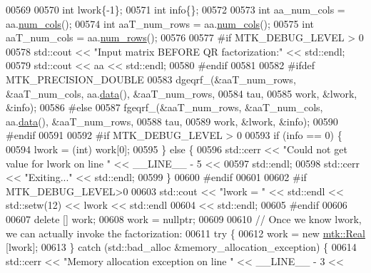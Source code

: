 \begin{DoxyCode}
00569 
00570   \textcolor{keywordtype}{int} lwork\{-1\};
00571   \textcolor{keywordtype}{int} info\{\};
00572 
00573   \textcolor{keywordtype}{int} aa\_num\_cols = aa.\hyperlink{classmtk_1_1DenseMatrix_af6f78373aaf2136f0c78974d7c8de0a8}{num\_cols}();
00574   \textcolor{keywordtype}{int} aaT\_num\_rows = aa.\hyperlink{classmtk_1_1DenseMatrix_af6f78373aaf2136f0c78974d7c8de0a8}{num\_cols}();
00575   \textcolor{keywordtype}{int} aaT\_num\_cols = aa.\hyperlink{classmtk_1_1DenseMatrix_a17d8d3b9cc0926044b6972dd190a5c21}{num\_rows}();
00576 
00577 \textcolor{preprocessor}{  #if MTK\_DEBUG\_LEVEL > 0}
00578   std::cout << \textcolor{stringliteral}{"Input matrix BEFORE QR factorization:"} << std::endl;
00579   std::cout << aa << std::endl;
00580 \textcolor{preprocessor}{  #endif}
00581 
00582 \textcolor{preprocessor}{  #ifdef MTK\_PRECISION\_DOUBLE}
00583   dgeqrf\_(&aaT\_num\_rows, &aaT\_num\_cols, aa.\hyperlink{classmtk_1_1DenseMatrix_a16b3ff56feb2658b9fc7147d1de4d8e7}{data}(), &aaT\_num\_rows,
00584           tau,
00585           work, &lwork, &info);
00586 \textcolor{preprocessor}{  #else}
00587   fgeqrf\_(&aaT\_num\_rows, &aaT\_num\_cols, aa.\hyperlink{classmtk_1_1DenseMatrix_a16b3ff56feb2658b9fc7147d1de4d8e7}{data}(), &aaT\_num\_rows,
00588           tau,
00589           work, &lwork, &info);
00590 \textcolor{preprocessor}{  #endif}
00591 
00592 \textcolor{preprocessor}{  #if MTK\_DEBUG\_LEVEL > 0}
00593   \textcolor{keywordflow}{if} (info == 0) \{
00594     lwork = (int) work[0];
00595   \} \textcolor{keywordflow}{else} \{
00596     std::cerr << \textcolor{stringliteral}{"Could not get value for lwork on line "} << \_\_LINE\_\_ - 5 <<
00597       std::endl;
00598     std::cerr << \textcolor{stringliteral}{"Exiting..."} << std::endl;
00599   \}
00600 \textcolor{preprocessor}{  #endif}
00601 
00602 \textcolor{preprocessor}{  #if MTK\_DEBUG\_LEVEL>0}
00603   std::cout << \textcolor{stringliteral}{"lwork = "} << std::endl << std::setw(12) << lwork << std::endl
00604     << std::endl;
00605 \textcolor{preprocessor}{  #endif}
00606 
00607   \textcolor{keyword}{delete} [] work;
00608   work = \textcolor{keyword}{nullptr};
00609 
00610   \textcolor{comment}{// Once we know lwork, we can actually invoke the factorization:}
00611   \textcolor{keywordflow}{try} \{
00612     work = \textcolor{keyword}{new} \hyperlink{group__c01-roots_gac080bbbf5cbb5502c9f00405f894857d}{mtk::Real} [lwork];
00613   \} \textcolor{keywordflow}{catch} (std::bad\_alloc &memory\_allocation\_exception) \{
00614     std::cerr << \textcolor{stringliteral}{"Memory allocation exception on line "} << \_\_LINE\_\_ - 3 <<

\end{DoxyCode}
